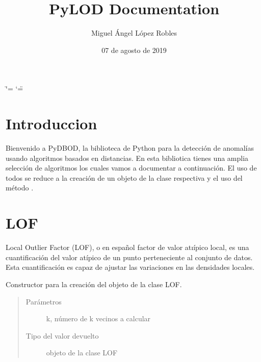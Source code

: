 \documentclass[letterpaper,10pt,spanish]{sphinxmanual}
\title{PyLOD Documentation}
\date{07 de agosto de 2019}
\author{Miguel Ángel López Robles}
\begin{document}
\ifdefined\shorthandoff
  \ifnum\catcode`\=\string=\active\shorthandoff{=}\fi
  \ifnum\catcode`\"=\active{}\fi
\fi

\pagestyle{empty}
\sphinxmaketitle
\pagestyle{plain}
\sphinxtableofcontents
\pagestyle{normal}
\label{\detokenize{index::doc}}



\chapter{Introduccion}
\label{\detokenize{index:introduccion}}
Bienvenido a PyDBOD, la biblioteca de Python para la detección de anomalías usando
algoritmos basados en distancias. En esta bibliotica tienes una amplia selección de
algoritmos los cuales vamos a documentar a continuación. El uso de todos se reduce a
la creación de un objeto de la clase respectiva y el uso del método .


\chapter{LOF}
\label{\detokenize{index:lof}}
Local Outlier Factor (LOF), o en español factor de valor atıípico local, es
una cuantificación del valor atípico de un punto perteneciente al conjunto de
datos. Esta cuantificación es capaz de ajustar las variaciones en las densidades
locales.

\begin{fulllineitems}
\label{\detokenize{index:LOF}}
Constructor para la creación del objeto de la clase LOF.
\begin{quote}\begin{description}
\item[{Parámetros}] \leavevmode
{} \textendash{} k, número de k vecinos a calcular

\item[{Tipo del valor devuelto}] \leavevmode
objeto de la clase LOF

\end{description}\end{quote}

\end{fulllineitems}

\end{document}
